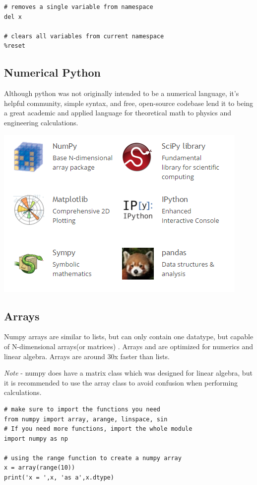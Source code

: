 \documentclass[%
oneside,                 %
final,                   %
10pt]{article}
\begin{document}
\begin{Verbatim}[numbers=none,fontsize=\fontsize{9pt}{9pt},baselinestretch=0.95,xleftmargin=2mm]
# removes a single variable from namespace
del x

# clears all variables from current namespace
%reset
\end{Verbatim}


\subsection{Numerical Python}

Although python was not originally intended to be a numerical language, it's helpful community, simple syntax, and free, open-source codebase lend it to being a great academic and applied language for theoretical math to physics and engineering calculations.



\centerline{\includegraphics[width=0.75\linewidth]{fig/scipy.png}}



\subsection{Arrays}
\label{sec:arrays}

Numpy arrays are similar to lists, but can only contain one datatype, but capable of N-dimensional arrays(or matrices) . Arrays and are optimized for numerics and linear algebra. Arrays are around 30x faster than lists.

\emph{Note} - numpy does have a matrix class which was designed for linear algebra, but it is recommended to use the array class to avoid confusion when performing calculations.

\begin{Verbatim}[numbers=none,fontsize=\fontsize{9pt}{9pt},baselinestretch=0.95,xleftmargin=2mm]
# make sure to import the functions you need
from numpy import array, arange, linspace, sin
# If you need more functions, import the whole module
import numpy as np

# using the range function to create a numpy array
x = array(range(10))
print('x = ',x, 'as a',x.dtype)
\end{Verbatim}
\end{document}

